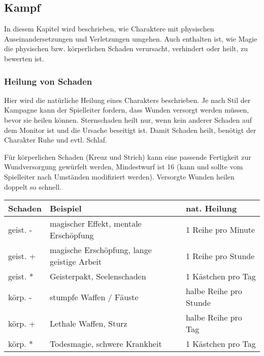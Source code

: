 \documentclass{article}
\begin{document}
\begin{center}
\section{Kampf}
\end{center}

In diesem Kapitel wird beschrieben, wie Charaktere mit physischen Auseinandersetzungen und Verletzungen umgehen. Auch
enthalten ist, wie Magie die physischen bzw. körperlichen Schaden verursacht, verhindert oder heilt, zu bewerten ist.

\subsubsection{Heilung von Schaden}

Hier wird die natürliche Heilung eines Charakters beschrieben. Je nach Stil der Kampagne kann der Spielleiter
fordern, dass Wunden versorgt werden müssen, bevor sie heilen können. Sternschaden heilt nur, wenn kein anderer Schaden
auf dem Monitor ist und die Ursache beseitigt ist. Damit Schaden heilt, benötigt der Charakter Ruhe und evtl. Schlaf.

Für körperlichen Schaden (Kreuz und Strich) kann eine passende Fertigkeit zur Wundversorgung gewürfelt werden,
Mindestwurf ist 16 (kann und sollte vom Spielleiter nach Umständen modifiziert werden). Versorgte Wunden heilen
doppelt so schnell.


\begin{small}
\begin{tabular}{|m{3cm}|m{5cm}|m{5cm}|}
\hline
\textbf{Schaden}&\textbf{Beispiel}&\textbf{nat. Heilung}\\
\hline
\hline
geist. -&magischer Effekt, mentale Erschöpfung&1 Reihe pro Minute\\
\hline
geist. +&magische Erschöpfung, lange geistige Arbeit&1 Reihe pro Stunde\\
\hline
geist. *&Geisterpakt, Seelenschaden&1 Kästchen pro Tag\\
\hline
körp. -&stumpfe Waffen / Fäuste&halbe Reihe pro Stunde\\
\hline
körp. +&Lethale Waffen, Sturz&halbe Reihe pro Tag\\
\hline
körp. *&Todesmagie, schwere Krankheit&1 Kästchen pro Tag\\
\hline
\end{tabular}
\end{small}
\end{document}
